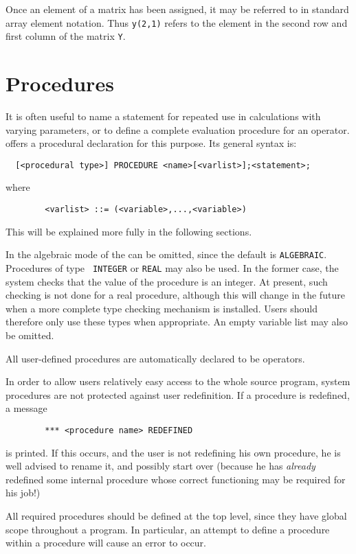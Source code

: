 Once an element of a matrix has been assigned, it may be referred to in
standard array element notation.  Thus {\tt y(2,1)} refers to the element
in the second row and first column of the matrix {\tt Y}.

\chapter{Procedures}

It is often useful to name a statement for repeated use in calculations
with varying parameters, or to define a complete evaluation procedure for
an operator. {\REDUCE} offers a procedural declaration for this purpose. Its
general syntax is:
\begin{verbatim}
  [<procedural type>] PROCEDURE <name>[<varlist>];<statement>;
\end{verbatim}
where
\begin{verbatim}
        <varlist> ::= (<variable>,...,<variable>)
\end{verbatim}
This will be explained more fully in the following sections.

In the algebraic mode of {\REDUCE} the {\tt <procedure type>} can be
omitted, since the default is {\tt ALGEBRAIC}.  Procedures of type {\tt
INTEGER} or {\tt REAL} may also be used.  In the former case, the system
checks that the value of the procedure is an integer.  At present, such
checking is not done for a real procedure, although this will change in
the future when a more complete type checking mechanism is installed.
Users should therefore only use these types when appropriate.  An empty
variable list may also be omitted.

All user-defined procedures are automatically declared to be operators.

In order to allow users relatively easy access to the whole {\REDUCE} source
program, system procedures are not protected against user redefinition. If
a procedure is redefined, a message
\begin{verbatim}
        *** <procedure name> REDEFINED
\end{verbatim}
is printed. If this occurs, and the user is not redefining his own
procedure, he is well advised to rename it, and possibly start over
(because he has {\em already\/} redefined some internal procedure whose correct
functioning may be required for his job!)

All required procedures should be defined at the top level, since they
have global scope throughout a program. In particular, an attempt to
define a procedure within a procedure will cause an error to occur.

